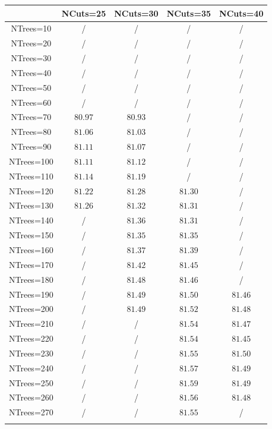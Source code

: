 \centering
\begin{tabular}{ccccc} \toprule\toprule
 & NCuts=25 & NCuts=30 & NCuts=35 & NCuts=40\\\midrule
NTrees=10 &  / &  / &  / &  /\\
NTrees=20 &  / &  / &  / &  /\\
NTrees=30 &  / &  / &  / &  /\\
NTrees=40 &  / &  / &  / &  /\\
NTrees=50 &  / &  / &  / &  /\\
NTrees=60 &  / &  / &  / &  /\\
NTrees=70 & $80.97$ & $80.93$ &  / &  /\\
NTrees=80 & $81.06$ & $81.03$ &  / &  /\\
NTrees=90 & $81.11$ & $81.07$ &  / &  /\\
NTrees=100 & $81.11$ & $81.12$ &  / &  /\\
NTrees=110 & $81.14$ & $81.19$ &  / &  /\\
NTrees=120 & $81.22$ & $81.28$ & $81.30$ &  /\\
NTrees=130 & $81.26$ & $81.32$ & $81.31$ &  /\\
NTrees=140 &  / & $81.36$ & $81.31$ &  /\\
NTrees=150 &  / & $81.35$ & $81.35$ &  /\\
NTrees=160 &  / & $81.37$ & $81.39$ &  /\\
NTrees=170 &  / & $81.42$ & $81.45$ &  /\\
NTrees=180 &  / & $81.48$ & $81.46$ &  /\\
NTrees=190 &  / & $81.49$ & $81.50$ & $81.46$\\
NTrees=200 &  / & $81.49$ & $81.52$ & $81.48$\\
NTrees=210 &  / &  / & $81.54$ & $81.47$\\
NTrees=220 &  / &  / & $81.54$ & $81.45$\\
NTrees=230 &  / &  / & $81.55$ & $81.50$\\
NTrees=240 &  / &  / & $81.57$ & $81.49$\\
NTrees=250 &  / &  / & $81.59$ & $81.49$\\
NTrees=260 &  / &  / & $81.56$ & $81.48$\\
NTrees=270 &  / &  / & $81.55$ &  /\\
\bottomrule\bottomrule\\
\end{tabular}
